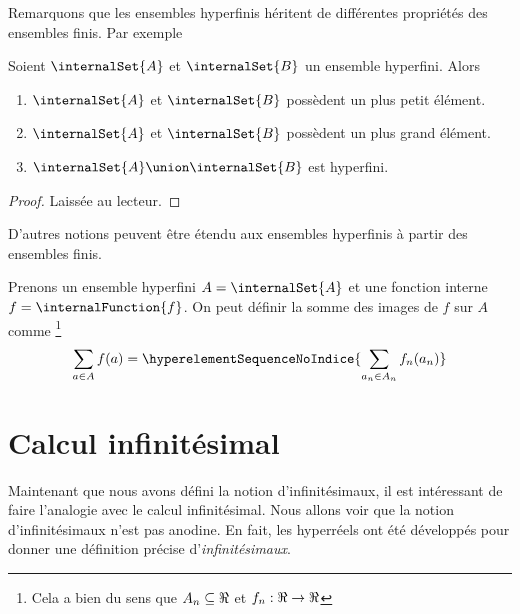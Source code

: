 Remarquons que les ensembles hyperfinis héritent de différentes propriétés des
ensembles finis. Par exemple
\begin{proposition}
	Soient $\internalSet{A}$ et $\internalSet{B}$ un ensemble hyperfini. Alors
	\begin{enumerate}
		\item $\internalSet{A}$ et $\internalSet{B}$ possèdent un plus petit élément.
		\item $\internalSet{A}$ et $\internalSet{B}$ possèdent un plus grand élément.
		\item $\internalSet{A} \union \internalSet{B}$ est hyperfini.
	\end{enumerate}
\end{proposition}

\begin{proof}
	Laissée au lecteur.
\end{proof}

D'autres notions peuvent être étendu aux ensembles hyperfinis à partir des
ensembles finis.

Prenons un ensemble hyperfini $A = \internalSet{A}$ et une fonction interne
$f = \internalFunction{f}$. On peut définir la somme des images de $f$ sur $A$
comme
\footnote{Cela a bien du sens que $A_{n} \subseteq \real$ et
$f_{n} : \real \rightarrow \real$}
\begin{equation}
	\sum_{a \in A} f(a) = \hyperelementSequenceNoIndice{\sum_{a_{n} \in A_{n}} f_{n}(a_{n})}
\end{equation}





\section{Calcul infinitésimal}

Maintenant que nous avons défini la notion d'infinitésimaux, il est intéressant
de faire l'analogie avec le calcul infinitésimal. Nous allons voir que la notion
d'infinitésimaux n'est pas anodine. En fait, les hyperréels ont été développés
pour donner une définition précise d'\textit{infinitésimaux}.

